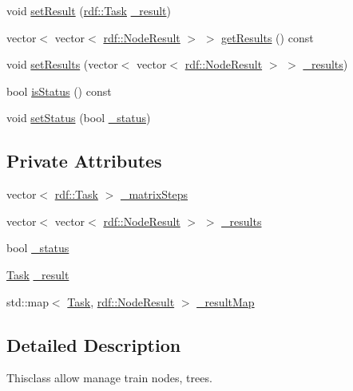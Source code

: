 \begin{DoxyCompactItemize}
\item 
void \hyperlink{classrdf_1_1ForestManager_af54eefeab5a70439d23ebf43fc549e6d}{set\+Result} (\hyperlink{classrdf_1_1Task}{rdf\+::\+Task} \hyperlink{classrdf_1_1ForestManager_ae2ba9a9f403d88f6343cf374d69f8a17}{\+\_\+result})
\item 
vector$<$ vector$<$ \hyperlink{classrdf_1_1NodeResult}{rdf\+::\+Node\+Result} $>$ $>$ \hyperlink{classrdf_1_1ForestManager_a009d3210babe33268dcf5e5698cfaeca}{get\+Results} () const 
\item 
void \hyperlink{classrdf_1_1ForestManager_a2e03f8ee1756620a2f528c28be13009b}{set\+Results} (vector$<$ vector$<$ \hyperlink{classrdf_1_1NodeResult}{rdf\+::\+Node\+Result} $>$ $>$ \hyperlink{classrdf_1_1ForestManager_a818d29de52bed7f09084c71d687ddd4f}{\+\_\+results})
\item 
bool \hyperlink{classrdf_1_1ForestManager_a90ec517ef47983b2d8998a8eafe46ecc}{is\+Status} () const 
\item 
void \hyperlink{classrdf_1_1ForestManager_af141b0f89158084ff1e777141dae69f2}{set\+Status} (bool \hyperlink{classrdf_1_1ForestManager_a8aa48a6543d83bf43be3b0bc8a8ab253}{\+\_\+status})
\end{DoxyCompactItemize}
\subsection*{Private Attributes}
\begin{DoxyCompactItemize}
\item 
vector$<$ \hyperlink{classrdf_1_1Task}{rdf\+::\+Task} $>$ \hyperlink{classrdf_1_1ForestManager_a34fac652fc47cf8af5f7b292219d85ed}{\+\_\+matrix\+Steps}
\item 
vector$<$ vector$<$ \hyperlink{classrdf_1_1NodeResult}{rdf\+::\+Node\+Result} $>$ $>$ \hyperlink{classrdf_1_1ForestManager_a818d29de52bed7f09084c71d687ddd4f}{\+\_\+results}
\item 
bool \hyperlink{classrdf_1_1ForestManager_a8aa48a6543d83bf43be3b0bc8a8ab253}{\+\_\+status}
\item 
\hyperlink{classrdf_1_1Task}{Task} \hyperlink{classrdf_1_1ForestManager_ae2ba9a9f403d88f6343cf374d69f8a17}{\+\_\+result}
\item 
std\+::map$<$ \hyperlink{classrdf_1_1Task}{Task}, \hyperlink{classrdf_1_1NodeResult}{rdf\+::\+Node\+Result} $>$ \hyperlink{classrdf_1_1ForestManager_ad764e01a338ea42ad8b2eaf360971875}{\+\_\+result\+Map}
\end{DoxyCompactItemize}


\subsection{Detailed Description}
Thisclass allow manage train nodes, trees. 

